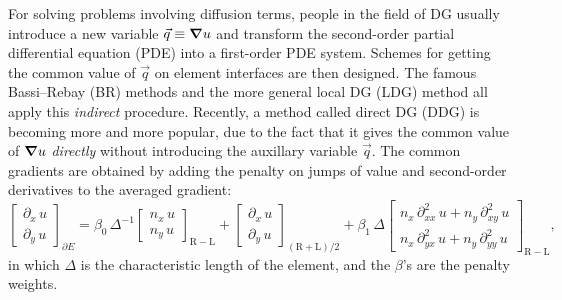 \documentclass[10pt,draft]{article}
\begin{document}
%
For solving problems involving diffusion terms, people in the field of DG usually introduce a new variable $\vec{q} \equiv \grad u$ and transform the second-order partial differential equation (PDE) into a first-order PDE system.
%
Schemes for getting the common value of $\vec{q}$ on element interfaces are then designed.
%
The famous Bassi--Rebay (BR) methods \cite{Bassi_1997,Bassi_2005} and the more general local DG (LDG) method \cite{Cockburn_1998b} all apply this \emph{indirect} procedure.
%
Recently, a method called direct DG (DDG) \cite{Liu_2009_DDG,Cheng_2016,Yang_2019} is becoming more and more popular, due to the fact that it gives the common value of $\grad u$ \emph{directly} without introducing the auxillary variable $\vec{q}$.
%
The common gradients are obtained by adding the penalty on jumps of value and second-order derivatives to the averaged gradient:
$$
\begin{bmatrix}\partial_{x}\,u\\
\partial_{y}\,u
\end{bmatrix}_{\partial E}=\beta_{0}\,\Delta^{-1}\begin{bmatrix}n_{x}\,u\\
n_{y}\,u
\end{bmatrix}_{\mathrm{R}-\mathrm{L}}+\begin{bmatrix}\partial_{x}\,u\\
\partial_{y}\,u
\end{bmatrix}_{(\mathrm{R}+\mathrm{L})/2}+\beta_{1}\,\Delta
\begin{bmatrix}
n_x\,\partial^2_{xx}\,u + n_y\,\partial^2_{xy}\,u\\
n_x\,\partial^2_{yx}\,u + n_y\,\partial^2_{yy}\,u
\end{bmatrix}_{\mathrm{R}-\mathrm{L}},
$$
in which $\Delta$ is the characteristic length of the element, and the $\beta$'s are the penalty weights.
%
\end{document}
